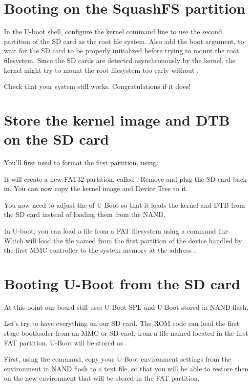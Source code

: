 \section{Booting on the SquashFS partition}

In the U-boot shell, configure the kernel command line to use the
second partition of the SD card as the root file system. Also add the
 boot argument, to wait for the SD card to be properly
initialized before trying to mount the root filesystem. Since the SD
cards are detected asynchronously by the kernel, the kernel might try
to mount the root filesystem too early without .

Check that your system still works. Congratulations if it does!

\section{Store the kernel image and DTB on the SD card}

You'll first need to format the first partition, using:

It will create a new FAT32 partition, called . Remove and
plug the SD card back in. You can now copy the kernel image and
Device Tree to it.

You now need to adjust the  of U-Boot so
that it loads the kernel and DTB from the SD card instead of loading
them from the NAND.

In U-boot, you can load a file from a FAT filesystem using a command
like
Which will load the file named  from the first
partition of the device handled by the first MMC controller to the
system memory at the address .

\section{Booting U-Boot from the SD card}

At this point our board still uses U-Boot SPL and U-Boot
stored in NAND flash.

Let's try to have everything on our SD card.
The ROM code can load the first stage bootloader from an MMC or SD
card, from a file named  located in the first FAT
partition. U-Boot will be stored as .

First, using the  command, copy your U-Boot
environment settings from the environment in NAND
flash to a text file, so that you will be able to restore then
on the new environment that will be stored in the FAT partition.

